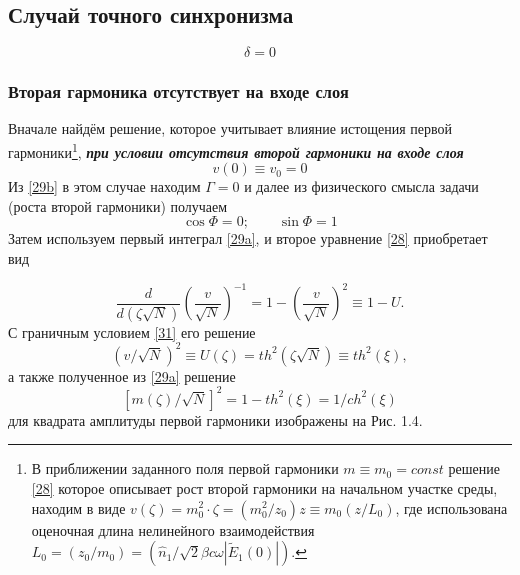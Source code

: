 \documentclass[a4paper]{article}
\begin{document}
 	\subsection{Случай точного синхронизма}
 		\begin{equation}
 			\delta=0\label{30}
 		\end{equation}
 	\subsubsection{Вторая гармоника отсутствует на входе слоя}
 		 Вначале найдём решение, которое учитывает влияние истощения первой гармоники\footnote{В приближении заданного поля первой гармоники $m\equiv m_{0}=const$ решение \eqref{28} которое описывает рост второй гармоники на начальном участке среды, находим в виде $v(\zeta)=m_{0}^{2}\cdot\zeta=(m_{0}^{2}/z_{0})z\equiv m_{0}(z/L_{0})$, где использована оценочная  длина нелинейного взаимодействия $L_{0}=(z_{0}/m_{0})=(\hat{n}_{1}/\sqrt{2}\beta c\omega\left|\tilde{E}_{1}(0)\right|)$.}, \textit{\textbf{при условии отсутствия второй гармоники на входе слоя }}
 		\begin{equation}
 			v(0)\equiv v_{0}=0\label{31}
 		\end{equation}
	Из \eqref{29b} в этом случае находим $\Gamma=0$ и далее из физического смысла задачи (роста второй гармоники) получаем 
	\begin{equation}
		\cos\Phi=0;\qquad\sin\Phi=1\label{32}
	\end{equation}
	Затем используем первый интеграл \eqref{29a}, и второе уравнение \eqref{28} приобретает вид
	
	\begin{equation}
		\frac{d}{d(\zeta\sqrt{N})}\left(\frac{v}{\sqrt{N}}\right)^{-1}=1-\left(\frac{v}{\sqrt{N}}\right)^{2}\equiv1-U.\label{33}
	\end{equation}
	С граничным условием \eqref{31} его решение 
	\begin{equation}
		(v/\sqrt{N})^{2}\equiv U(\zeta)=th^{2}(\zeta\sqrt{N})\equiv th^{2}(\xi),\tag{34v}\label{34v}
	\end{equation}
	а также полученное из \eqref{29a} решение 
	\begin{equation}
		\left[m(\zeta)/\sqrt{N}\right]^{2}=1-th^{2}(\xi)=1/ch^{2}(\xi)\tag{34m}\label{34m}
	\end{equation}
	для квадрата амплитуды первой гармоники изображены на Рис. 1.4.
	 
	\vspace{5cm}
	
\end{document}
